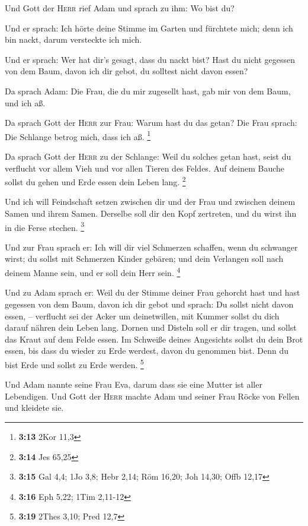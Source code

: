  Und Gott der \textsc{Herr} rief Adam und sprach zu ihm:
Wo bist du?

 Und er sprach: Ich hörte deine Stimme im Garten und
fürchtete mich; denn ich bin nackt, darum versteckte ich mich.

 Und er sprach: Wer hat dir's gesagt, dass du nackt bist?
Hast du nicht gegessen von dem Baum, davon ich dir gebot, du solltest
nicht davon essen?

 Da sprach Adam: Die Frau, die du mir zugesellt hast, gab
mir von dem Baum, und ich aß.

 Da sprach Gott der \textsc{Herr} zur Frau: Warum hast du
das getan? Die Frau sprach: Die Schlange betrog mich, dass ich aß.
\footnote{\textbf{3:13} 2Kor 11,3}

 Da sprach Gott der \textsc{Herr} zu der Schlange: Weil
du solches getan hast, seist du verflucht vor allem Vieh und vor allen
Tieren des Feldes. Auf deinem Bauche sollst du gehen und Erde essen dein
Leben lang. \footnote{\textbf{3:14} Jes 65,25}

 Und ich will Feindschaft setzen zwischen dir und der
Frau und zwischen deinem Samen und ihrem Samen. Derselbe soll dir den
Kopf zertreten, und du wirst ihn in die Ferse stechen. \footnote{\textbf{3:15}
  Gal 4,4; 1Jo 3,8; Hebr 2,14; Röm 16,20; Joh 14,30; Offb 12,17}

 Und zur Frau sprach er: Ich will dir viel Schmerzen
schaffen, wenn du schwanger wirst; du sollst mit Schmerzen Kinder
gebären; und dein Verlangen soll nach deinem Manne sein, und er soll
dein Herr sein. \footnote{\textbf{3:16} Eph 5,22; 1Tim 2,11-12}

 Und zu Adam sprach er: Weil du der Stimme deiner Frau
gehorcht hast und hast gegessen von dem Baum, davon ich dir gebot und
sprach: Du sollst nicht davon essen, -- verflucht sei der Acker um
deinetwillen, mit Kummer sollst du dich darauf nähren dein Leben lang.
 Dornen und Disteln soll er dir tragen, und sollst das
Kraut auf dem Felde essen.  Im Schweiße deines Angesichts
sollst du dein Brot essen, bis dass du wieder zu Erde werdest, davon du
genommen bist. Denn du bist Erde und sollst zu Erde werden. \footnote{\textbf{3:19}
  2Thes 3,10; Pred 12,7}

 Und Adam nannte seine Frau Eva, darum dass sie eine
Mutter ist aller Lebendigen.  Und Gott der \textsc{Herr}
machte Adam und seiner Frau Röcke von Fellen und kleidete sie.

